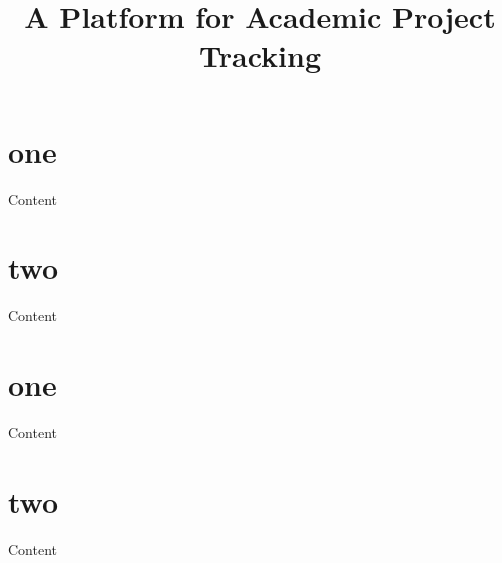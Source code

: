 \documentclass[12pt]{article}
\begin{document}
\title{A Platform for Academic Project Tracking}
\maketitle
\section{one}
    Content
\section{two}
    Content
\section{one}
    Content
\section{two}
    Content
\end{document}
